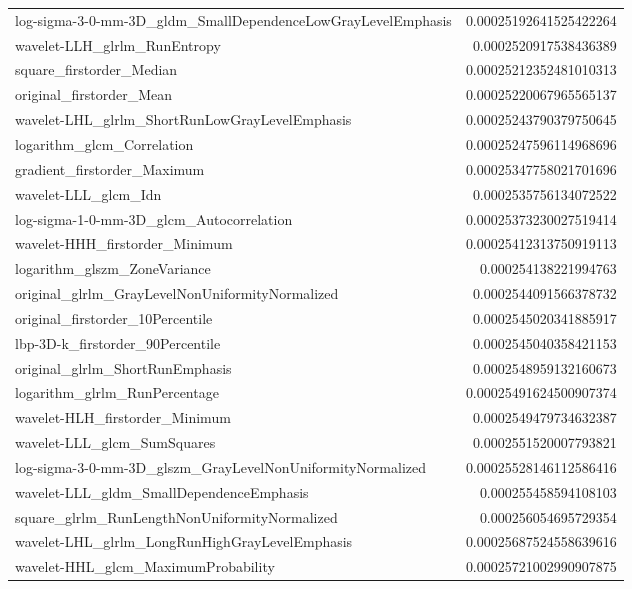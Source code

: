 {\begin{xltabular}[H]{\textwidth}{X r}
        log-sigma-3-0-mm-3D\_gldm\_SmallDependenceLowGrayLevelEmphasis & 0.00025192641525422264 \\
        wavelet-LLH\_glrlm\_RunEntropy & 0.0002520917538436389 \\
        square\_firstorder\_Median & 0.00025212352481010313 \\
        original\_firstorder\_Mean & 0.00025220067965565137 \\
        wavelet-LHL\_glrlm\_ShortRunLowGrayLevelEmphasis & 0.00025243790379750645 \\
        logarithm\_glcm\_Correlation & 0.00025247596114968696 \\
        gradient\_firstorder\_Maximum & 0.00025347758021701696 \\
        wavelet-LLL\_glcm\_Idn & 0.0002535756134072522 \\
        log-sigma-1-0-mm-3D\_glcm\_Autocorrelation & 0.00025373230027519414 \\
        wavelet-HHH\_firstorder\_Minimum & 0.00025412313750919113 \\
        logarithm\_glszm\_ZoneVariance & 0.000254138221994763 \\
        original\_glrlm\_GrayLevelNonUniformityNormalized & 0.0002544091566378732 \\
        original\_firstorder\_10Percentile & 0.0002545020341885917 \\
        lbp-3D-k\_firstorder\_90Percentile & 0.0002545040358421153 \\
        original\_glrlm\_ShortRunEmphasis & 0.0002548959132160673 \\
        logarithm\_glrlm\_RunPercentage & 0.00025491624500907374 \\
        wavelet-HLH\_firstorder\_Minimum & 0.0002549479734632387 \\
        wavelet-LLL\_glcm\_SumSquares & 0.0002551520007793821 \\
        log-sigma-3-0-mm-3D\_glszm\_GrayLevelNonUniformityNormalized & 0.00025528146112586416 \\
        wavelet-LLL\_gldm\_SmallDependenceEmphasis & 0.000255458594108103 \\
        square\_glrlm\_RunLengthNonUniformityNormalized & 0.000256054695729354 \\
        wavelet-LHL\_glrlm\_LongRunHighGrayLevelEmphasis & 0.00025687524558639616 \\
        wavelet-HHL\_glcm\_MaximumProbability & 0.00025721002990907875 \\

\end{xltabular}}
